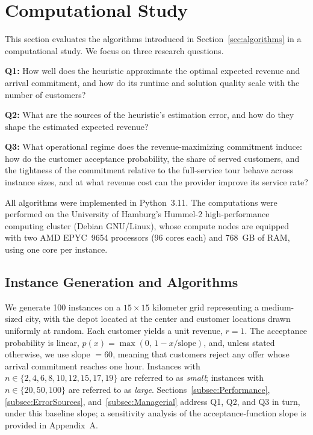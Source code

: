 \documentclass[11pt]{article}
\theoremstyle{plain}
\theoremstyle{definition}
\begin{document}
 \section{Computational Study}
 \label{sec:experiments}
 This section evaluates the algorithms introduced in Section~\ref{sec:algorithms} in a computational study. We focus on three research questions.

 \textbf{Q1:} How well does the heuristic approximate the optimal expected revenue and arrival commitment, and how do its runtime and solution quality scale with the number of customers?

 \textbf{Q2:} What are the sources of the heuristic's estimation error, and how do they shape the estimated expected revenue?

 \textbf{Q3:} What operational regime does the revenue-maximizing commitment induce: how do the customer acceptance probability, the share of served customers, and the tightness of the commitment relative to the full-service tour behave across instance sizes, and at what revenue cost can the provider improve its service rate?
 
 All algorithms
 were implemented in Python~3.11. The computations were performed on the University of Hamburg's Hummel-2
 high-performance computing cluster (Debian GNU/Linux), whose compute nodes are equipped with two AMD EPYC~9654 processors (96 cores each) and 768~GB of RAM, using one core per instance.
 
 \subsection{Instance Generation and Algorithms}
 We generate 100 instances on a $15 \times 15$ kilometer grid representing a medium-sized city, with the depot located at the center and customer locations drawn uniformly at random. Each customer yields a unit revenue, $r = 1$. The acceptance probability is linear, $p(x) = \max(0,\, 1 - x/\text{slope})$, and, unless stated otherwise, we use slope $= 60$, meaning that customers reject any offer whose arrival commitment reaches one hour. Instances with $n \in \{2, 4, 6, 8, 10, 12, 15, 17, 19\}$ are referred to as \textit{small}; instances with $n \in \{20, 50, 100\}$ are referred to as \textit{large}. Sections~\ref{subsec:Performance}, \ref{subsec:ErrorSources}, and~\ref{subsec:Managerial} address Q1, Q2, and Q3 in turn, under this baseline slope; a sensitivity analysis of the acceptance-function slope is provided in Appendix~A.
 
\end{document}
